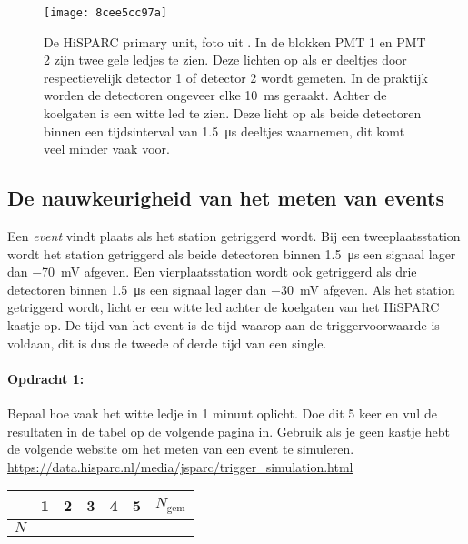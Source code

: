 \begin{figure}[ht]
    \centering
    \texttt{[image: 8cee5cc97a]}
    \caption{De HiSPARC primary unit, foto uit \cite{nikhefhisparc}. In de
             blokken PMT 1 en PMT 2 zijn twee gele ledjes te zien. Deze
             lichten op als er deeltjes door respectievelijk detector 1
             of detector 2 wordt gemeten. In de praktijk worden de
             detectoren ongeveer elke \SI{10}{\milli\second} geraakt.
             Achter de koelgaten is een witte led te zien. Deze licht op
             als beide detectoren binnen een tijdsinterval van
             \SI{1.5}{\micro\second} deeltjes waarnemen, dit komt veel
             minder vaak voor.}
\end{figure}


\subsection{De nauwkeurigheid van het meten van events}

Een \emph{event} vindt plaats als het station getriggerd wordt.
Bij een tweeplaatsstation wordt het station getriggerd als beide detectoren
binnen \SI{1,5}{\micro\second} een signaal lager dan \SI{-70}{\milli\volt}
afgeven. Een vierplaatsstation wordt ook getriggerd als drie detectoren
binnen \SI{1,5}{\micro\second} een signaal lager dan \SI{-30}{\milli\volt}
afgeven. Als het station getriggerd wordt, licht er een witte led
achter de koelgaten van het HiSPARC kastje op. De tijd van het event
is de tijd waarop aan de triggervoorwaarde is voldaan, dit is dus
de tweede of derde tijd van een single.

\begin{minipage}[t]{1\columnwidth}%

\paragraph{Opdracht 1:}

Bepaal hoe vaak het witte ledje in 1 minuut oplicht. Doe dit 5 keer
en vul de resultaten in de tabel op de volgende pagina in.
Gebruik als je geen \hisparc kastje hebt de volgende website om het
meten van een event te simuleren.\\
\url{https://data.hisparc.nl/media/jsparc/trigger_simulation.html}


\vspace{1em}
\begin{tabular}{|x{.11\textwidth}|x{.11\textwidth}|x{.11\textwidth}
                |x{.11\textwidth}|x{.11\textwidth}|x{.11\textwidth}
                |x{.11\textwidth}|}
     & 1 & 2 & 3 & 4 & 5 & $N_\textrm{gem}$\\
    \hline
    $N$ &  &  &  &  &  & \tabularnewline
    \hline
\end{tabular}%
\end{minipage}

